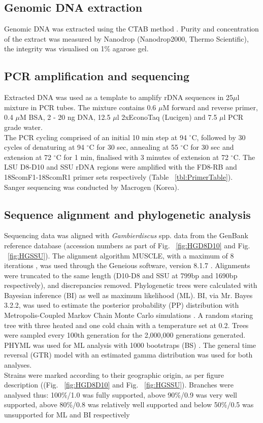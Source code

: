 \documentclass[12pt]{article}
\begin{document}
\subsection{Genomic DNA extraction}
Genomic DNA was extracted using the CTAB method \citep{zhou1999analysis}. Purity and concentration of the extract was measured by Nanodrop (Nanodrop2000, Thermo Scientific), the integrity was visualised on 1\% agarose gel.

\subsection{PCR amplification and sequencing}
Extracted DNA was used as a template to amplify rDNA sequences in 25$\mu$l mixture in PCR tubes. The mixture contains 0.6 $\mu$M forward and reverse primer, 0.4 $\mu$M BSA, 2 - 20 ng DNA, 12.5 $\mu$l 2xEconoTaq (Lucigen) and 7.5 $\mu$l PCR grade water.\\
The PCR cycling comprised of an initial 10 min step at 94 $^{\circ}$C, followed by 30 cycles of denaturing at 94 $^{\circ}$C for 30 sec, annealing at 55 $^{\circ}$C for 30 sec and extension at 72 $^{\circ}$C for 1 min, finalised with 3 minutes of extension at 72 $^{\circ}$C.
The LSU D8-D10 and SSU rDNA regions were amplified with the FD8-RB and 18ScomF1-18ScomR1 primer sets respectively (Table ~\ref{tbl:PrimerTable}).\\
Sanger sequencing was conducted by Macrogen (Korea).


\subsection{Sequence alignment and phylogenetic analysis}
Sequencing data was aligned with \emph{Gambierdiscus} spp. data from the GenBank reference database (accession numbers as part of Fig. ~\ref{fig:HGD8D10} and Fig. ~\ref{fig:HGSSU}). The alignment algorithm MUSCLE, with a maximum of 8 iterations \citep{edgar2004muscle}, was used through the Geneious software, version 8.1.7 \citep{kearse2012geneious}. Alignments were truncated to the same length (D10-D8 and SSU at 799bp and 1690bp respectively), and discrepancies removed.
Phylogenetic trees were calculated with Bayesian inference (BI) as well as maximum likelihood (ML). BI, via Mr. Bayes 3.2.2, was used to estimate the posterior probability (PP) distribution with Metropolis-Coupled Markov Chain Monte Carlo simulations \citep{ronquist2003mrbayes}. A random staring tree with three heated and one cold chain with a temperature set at 0.2. Trees were sampled every 100th generation for the 2,000,000 generations generated.
PHYML was used for ML analysis with 1000 bootstraps (BS) \citep{guindon2003simple}.
The general time reversal (GTR) model with an estimated gamma distribution was used for both analyses.\\
Strains were marked according to their geographic origin, as per figure description ((Fig. ~\ref{fig:HGD8D10} and Fig. ~\ref{fig:HGSSU}). Branches were analysed thus: 100\%/1.0 was fully supported, above 90\%/0.9 was very well supported, above 80\%/0.8 was relatively well supported and below 50\%/0.5 was unsupported for ML and BI respectively
\end{document}
